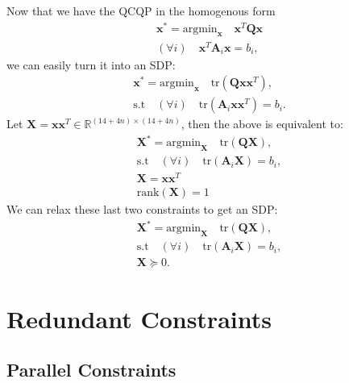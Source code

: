 \documentclass{article}
\begin{document}
Now that we have the QCQP in the homogenous form
\begin{align}
\mathbf{x}^* = \text{argmin}_{\mathbf{x}} \quad \mathbf{x}^T \mathbf{Q} \mathbf{x}\\
(\forall i) \quad \mathbf{x}^T \mathbf{A}_i \mathbf{x} = b_i,
\end{align}
we can easily turn it into an SDP:
\begin{align}
\mathbf{x}^* = \text{argmin}_{\mathbf{x}} \quad \text{tr}(\mathbf{Q}\mathbf{x}\mathbf{x}^T),\\
\text{s.t}\quad (\forall i) \quad \text{tr}(\mathbf{A}_i \mathbf{x} \mathbf{x}^T) = b_i.
\end{align}
Let $\mathbf{X} = \mathbf{x}\mathbf{x}^T \in \mathbb{R}^{(14 + 4n) \times (14 + 4n)}$, then the above is equivalent to:
\begin{align}
\mathbf{X}^* = \text{argmin}_{\mathbf{X}} \quad \text{tr}(\mathbf{Q}\mathbf{X}),\\
\text{s.t}\quad (\forall i) \quad \text{tr}(\mathbf{A}_i \mathbf{X}) = b_i,\\
\mathbf{X} = \mathbf{x} \mathbf{x}^T\\
\text{rank}(\mathbf{X}) = 1
\end{align}
We can relax these last two constraints to get an SDP:
\begin{align}
\mathbf{X}^* = \text{argmin}_{\mathbf{X}} \quad \text{tr}(\mathbf{Q}\mathbf{X}),\\
\text{s.t}\quad (\forall i) \quad \text{tr}(\mathbf{A}_i \mathbf{X}) = b_i,\\
\mathbf{X} \succeq 0.
\end{align}

\newpage
\section{Redundant Constraints}

\subsection{Parallel Constraints}
\end{document}
